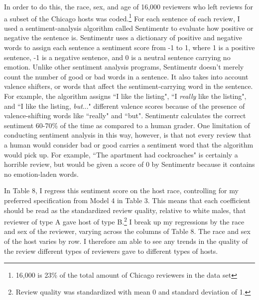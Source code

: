 \documentclass[11pt, oneside]{article}
\begin{document}
In order to do this, the race, sex, and age of 16,000 reviewers who left reviews for a subset of the Chicago hosts was coded.\footnote{16,000 is 23\% of the total amount of Chicago reviewers in the data set} For each sentence of each review, I used a sentiment-analysis algorithm called Sentimentr to evaluate how positive or negative the sentence is. Sentimentr uses a dictionary of positive and negative words to assign each sentence a sentiment score from -1 to 1, where 1 is a positive sentence, -1 is a negative sentence, and 0 is a neutral sentence carrying no emotion. Unlike other sentiment analysis programs, Sentimentr doesn't merely count the number of good or bad words in a sentence. It also takes into account valence shifters, or words that affect the sentiment-carrying word in the sentence. For example, the algorithm assigns ``I like the listing", ``I \textit{really} like the listing", and ``I like the listing, \textit{but}..." different valence scores because of the presence of valence-shifting words like ``really" and ``but". Sentimentr calculates the correct sentiment 60-70\% of the time as compared to a human grader. One limitation of conducting sentiment analysis in this way, however, is that not every review that a human would consider bad or good carries a sentiment word that the algorithm would pick up. For example, ``The apartment had cockroaches" is certainly a horrible review, but would be given a score of 0 by Sentimentr because it contains no emotion-laden words. 

In Table 8, I regress this sentiment score on the host race, controlling for my preferred specification from Model 4 in Table 3. This means that each coefficient should be read as the standardized review quality, relative to white males, that reviewer of type A gave host of type B.\footnote{Review quality was standardized with mean 0 and standard deviation of 1.} I break up my regressions by the race and sex of the reviewer, varying across the columns of Table 8. The race and sex of the host varies by row. I therefore am able to see any trends in the quality of the review different types of reviewers gave to different types of hosts. 
\end{document}
